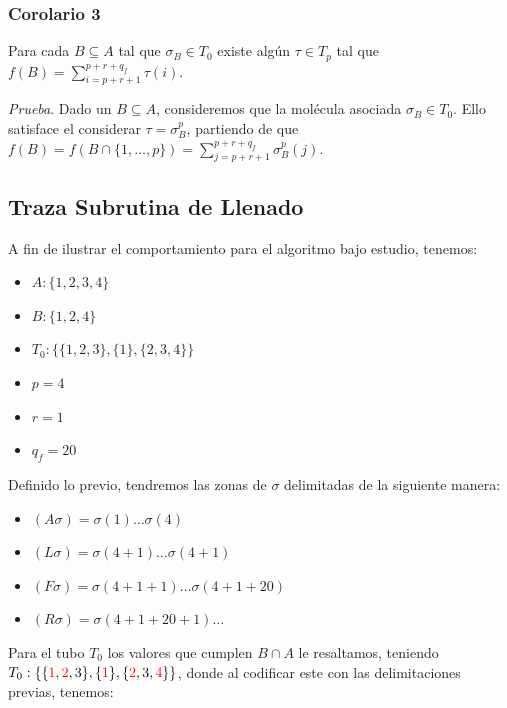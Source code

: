 \documentclass[12pt, letterpaper, twoside]{article}
\begin{document}
    \subsubsection{Corolario 3}
    Para cada $B\subseteq{A}$ tal que $\sigma_{B}\in{T_0}$ existe algún $\tau\in{T_{p}}$ tal que $f(B)=\sum^{p+r+q_f}_{i=p+r+1}\tau(i)$.

    \emph{Prueba}. Dado un $B\subseteq{A}$, consideremos que la molécula asociada $\sigma_{B}\in{T_0}$. Ello satisface el considerar $\tau=\sigma^{p}_{B}$, partiendo de que $f(B)=f(B\cap{\{1,\dots,p\}})=\sum^{p+r+q_f}_{j=p+r+1}\sigma^{p}_{B}(j)$. 

    \newpage
    \subsection{Traza Subrutina de Llenado}
    A fin de ilustrar el comportamiento para el algoritmo bajo estudio, tenemos:
    \begin{multicols}{2}
        \begin{itemize}
        \item $A: \{1, 2, 3, 4\}$
        \item $B: \{1, 2, 4\}$
        \item $T_0: \{\{1,2,3\}, \{1\}, \{2,3,4\}\}$
        \item $p = 4$
        \item $r = 1$
        \item $q_f= 20$
        \end{itemize}
    \end{multicols}

    Definido lo previo, tendremos las zonas de $\sigma$ delimitadas de la siguiente manera:
    \begin{multicols}{2}
        \begin{itemize}
            \item $(A\sigma )=\sigma (1)\dots\sigma (4)$
            \item $(L\sigma )=\sigma (4+1)\dots\sigma (4+1)$
            \item $(F\sigma)=\sigma(4+1+1)\dots\sigma(4+1+20)$
            \item $(R\sigma)=\sigma(4+1+20+1)\dots$
        \end{itemize} 
    \end{multicols}

    Para el tubo $T_0$ los valores que cumplen $B\cap{A}$ le resaltamos, teniendo $T_0: \{\{\textcolor{red}{1}, \textcolor{red}{2}, 3\}, \{\textcolor{red}{1}\}, \{\textcolor{red}{2},3,\textcolor{red}{4}\}\}$, donde al codificar este con las delimitaciones previas, tenemos:
\end{document}
